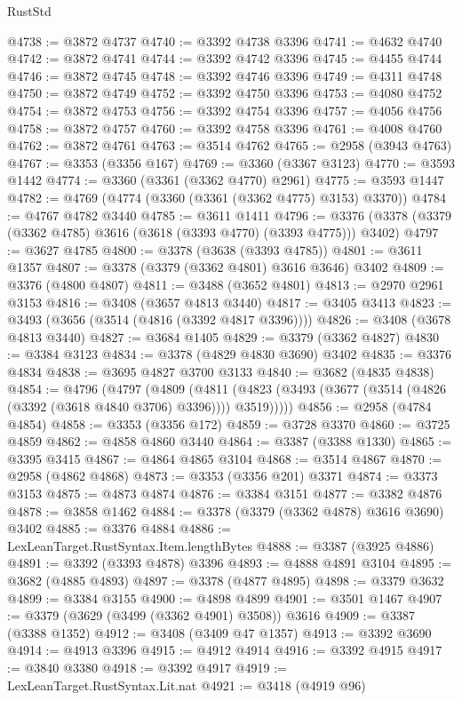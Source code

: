 \begin{lexlean}{RustStd}
\begin{coremodule}
@4738 := @3872 @4737
@4740 := @3392 @4738 @3396
@4741 := @4632 @4740
@4742 := @3872 @4741
@4744 := @3392 @4742 @3396
@4745 := @4455 @4744
@4746 := @3872 @4745
@4748 := @3392 @4746 @3396
@4749 := @4311 @4748
@4750 := @3872 @4749
@4752 := @3392 @4750 @3396
@4753 := @4080 @4752
@4754 := @3872 @4753
@4756 := @3392 @4754 @3396
@4757 := @4056 @4756
@4758 := @3872 @4757
@4760 := @3392 @4758 @3396
@4761 := @4008 @4760
@4762 := @3872 @4761
@4763 := @3514 @4762
@4765 := @2958 (@3943 @4763)
@4767 := @3353 (@3356 @167)
@4769 := @3360 (@3367 @3123)
@4770 := @3593 @1442
@4774 := @3360 (@3361 (@3362 @4770) @2961)
@4775 := @3593 @1447
@4782 := @4769 (@4774 (@3360 (@3361 (@3362 @4775) @3153) @3370))
@4784 := @4767 @4782 @3440
@4785 := @3611 @1411
@4796 := @3376 (@3378 (@3379 (@3362 @4785) @3616 (@3618 (@3393 @4770) (@3393 @4775))) @3402)
@4797 := @3627 @4785
@4800 := @3378 (@3638 (@3393 @4785))
@4801 := @3611 @1357
@4807 := @3378 (@3379 (@3362 @4801) @3616 @3646) @3402
@4809 := @3376 (@4800 @4807)
@4811 := @3488 (@3652 @4801)
@4813 := @2970 @2961 @3153
@4816 := @3408 (@3657 @4813 @3440)
@4817 := @3405 @3413
@4823 := @3493 (@3656 (@3514 (@4816 (@3392 @4817 @3396))))
@4826 := @3408 (@3678 @4813 @3440)
@4827 := @3684 @1405
@4829 := @3379 (@3362 @4827)
@4830 := @3384 @3123
@4834 := @3378 (@4829 @4830 @3690) @3402
@4835 := @3376 @4834
@4838 := @3695 @4827 @3700 @3133
@4840 := @3682 (@4835 @4838)
@4854 := @4796
    (@4797
      (@4809
        (@4811 (@4823 (@3493 (@3677 (@3514 (@4826 (@3392 (@3618 @4840 @3706) @3396)))) @3519)))))
@4856 := @2958 (@4784 @4854)
@4858 := @3353 (@3356 @172)
@4859 := @3728 @3370
@4860 := @3725 @4859
@4862 := @4858 @4860 @3440
@4864 := @3387 (@3388 @1330)
@4865 := @3395 @3415
@4867 := @4864 @4865 @3104
@4868 := @3514 @4867
@4870 := @2958 (@4862 @4868)
@4873 := @3353 (@3356 @201) @3371
@4874 := @3373 @3153
@4875 := @4873 @4874
@4876 := @3384 @3151
@4877 := @3382 @4876
@4878 := @3858 @1462
@4884 := @3378 (@3379 (@3362 @4878) @3616 @3690) @3402
@4885 := @3376 @4884
@4886 := LexLeanTarget.RustSyntax.Item.lengthBytes
@4888 := @3387 (@3925 @4886)
@4891 := @3392 (@3393 @4878) @3396
@4893 := @4888 @4891 @3104
@4895 := @3682 (@4885 @4893)
@4897 := @3378 (@4877 @4895)
@4898 := @3379 @3632
@4899 := @3384 @3155
@4900 := @4898 @4899
@4901 := @3501 @1467
@4907 := @3379 (@3629 (@3499 (@3362 @4901) @3508)) @3616
@4909 := @3387 (@3388 @1352)
@4912 := @3408 (@3409 @47 @1357)
@4913 := @3392 @3690
@4914 := @4913 @3396
@4915 := @4912 @4914
@4916 := @3392 @4915
@4917 := @3840 @3380
@4918 := @3392 @4917
@4919 := LexLeanTarget.RustSyntax.Lit.nat
@4921 := @3418 (@4919 @96)

\end{coremodule}
\end{lexlean}
